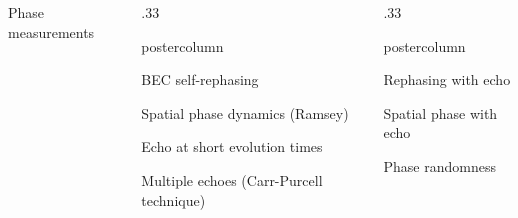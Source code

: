 \documentclass[final,hyperref={pdfpagelabels=false}]{beamer}
\newcommand{\mycolumn}[1]{
	\begin{column}{.33\textwidth}
	\begin{beamercolorbox}[center,wd=\textwidth]{postercolumn}
	\begin{minipage}[T]{.95\textwidth} %

	\parbox[t][\columnheight]{\textwidth}{ #1 }

	\end{minipage}
	\end{beamercolorbox}
	\end{column}
}
\newlength{\columnheight}
\begin{document}
\begin{frame}
\begin{columns}
{            \vfill

            \begin{block}{Phase measurements}
            \end{block}

} %

\mycolumn{
            
            \begin{block}{BEC self-rephasing}
            \end{block}

            \vfill
            
            \begin{block}{Spatial phase dynamics (Ramsey)}
            \end{block}

            \vfill

            \begin{block}{Echo at short evolution times}
            \end{block}

            \vfill

            \begin{block}{Multiple echoes (Carr-Purcell technique)}
            \end{block}

} %

\mycolumn{

            \begin{block}{Rephasing with echo}
            \end{block}
 
            \vfill

            \begin{block}{Spatial phase with echo}
            \end{block}

            \vfill

            \begin{block}{Phase randomness}
            \end{block}

} %

\end{columns}
\end{frame}
\end{document}
